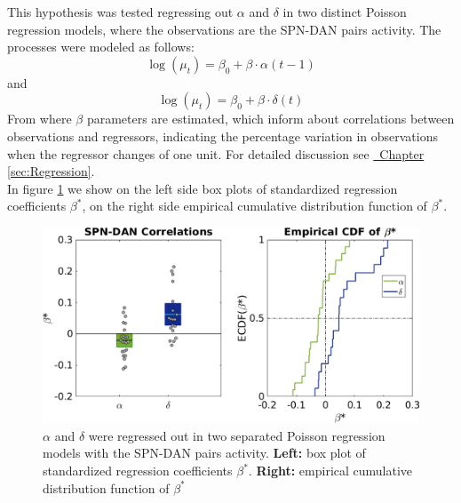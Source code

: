 This hypothesis was tested regressing out $\alpha$ and $\delta$ in two distinct Poisson regression models, where the observations are the SPN-DAN pairs activity. The processes were modeled as follows:
\begin{equation*}
    \log(\mu_t)=\beta_0+\beta\cdot\alpha(t-1)
\end{equation*}
and 
\begin{equation*}
    \log(\mu_t)=\beta_0+\beta\cdot\delta(t)
\end{equation*}
From where $\beta$ parameters are estimated, which inform about correlations between observations and regressors, indicating the percentage variation in observations when the regressor changes of one unit. For detailed discussion see \hyperref[sec:Regression]{~Chapter \ref*{sec:Regression}}.\\
In figure \ref{fig:RL_alphadelta} we show on the left side box plots of standardized regression coefficients $\beta^*$, on the right side empirical cumulative distribution function of $\beta^*$.\\
\begin{figure}
   \centering
    \includegraphics[scale=0.45]{figures/AlphaAndDeltaPavSPN3.png}
    \caption{$\alpha$ and $\delta$ were regressed out in two separated Poisson regression models with the SPN-DAN pairs activity. \textbf{Left:} box plot of standardized regression coefficients $\beta^*$. \textbf{Right:} empirical cumulative distribution function of $\beta^*$}
    \label{fig:RL_alphadelta}
\end{figure}
